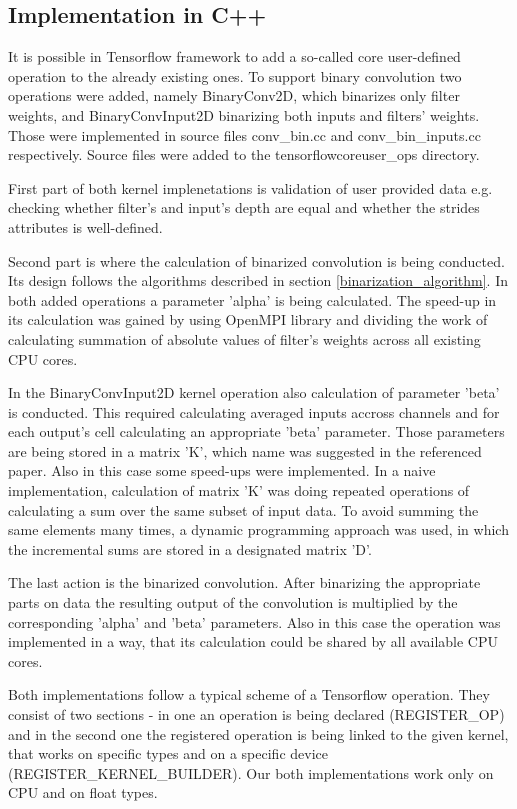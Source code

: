 \documentclass[licencjacka]{pracamgr}
\begin{document}
		\subsection{Implementation in C++}
		It is possible in Tensorflow framework to add a so-called core user-defined operation to the already existing ones. To support binary convolution two operations were added, namely BinaryConv2D, which binarizes only filter weights, and BinaryConvInput2D binarizing both inputs and filters' weights. Those were implemented in source files conv\_bin.cc and conv\_bin\_inputs.cc respectively. Source files were added to the \/tensorflow\/core\/user\_ops directory.

		First part of both kernel implenetations is validation of user provided data e.g. checking whether filter's and input's depth are equal and whether the strides attributes is well-defined.

		Second part is where the calculation of binarized convolution is being conducted. Its design follows the algorithms described in section \ref{binarization_algorithm}. In both added operations a parameter 'alpha' is being calculated. The speed-up in its calculation was gained by using OpenMPI library and dividing the work of calculating summation of absolute values of filter's weights across all existing CPU cores.

		In the BinaryConvInput2D kernel operation also calculation of parameter 'beta' is conducted. This required calculating averaged inputs accross channels and for each output's cell calculating an appropriate 'beta' parameter. Those parameters are being stored in a matrix 'K', which name was suggested in the referenced paper. Also in this case some speed-ups were implemented. In a naive implementation, calculation of matrix 'K' was doing repeated operations of calculating a sum over the same subset of input data. To avoid summing the same elements many times, a dynamic programming approach was used, in which the incremental sums are stored in a designated matrix 'D'.
	
		The last action is the binarized convolution. After binarizing the appropriate parts on data the resulting output of the convolution is multiplied by the corresponding 'alpha' and 'beta' parameters. Also in this case the operation was implemented in a way, that its calculation could be shared by all available CPU cores.

		Both implementations follow a typical scheme of a Tensorflow operation. They consist of two sections - in one an operation is being declared (REGISTER\_OP) and in the second one the registered operation is being linked to the given kernel, that works on specific types and on a specific device (REGISTER\_KERNEL\_BUILDER). Our both implementations work only on CPU and on float types. 
\end{document}

